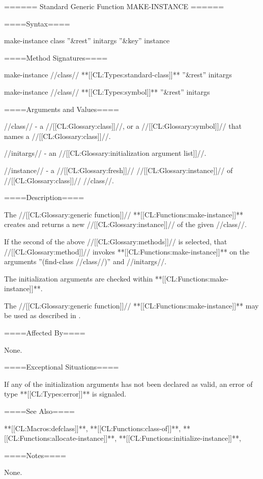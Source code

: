 ====== Standard Generic Function MAKE-INSTANCE ======

====Syntax====


\DefgenWithValues make-instance {class ''&rest'' initargs ''&key'' {\allowotherkeys}} {instance}


====Method Signatures====

\Defmeth make-instance {//class// **[[CL:Types:standard-class]]** ''&rest'' initargs}

\Defmeth make-instance {//class// **[[CL:Types:symbol]]** ''&rest'' initargs}

====Arguments and Values====


//class// - a //[[CL:Glossary:class]]//, or a //[[CL:Glossary:symbol]]// that names a //[[CL:Glossary:class]]//.

//initargs// - an //[[CL:Glossary:initialization argument list]]//.

//instance// - a //[[CL:Glossary:fresh]]// //[[CL:Glossary:instance]]// of //[[CL:Glossary:class]]// //class//.

====Description====

The //[[CL:Glossary:generic function]]// **[[CL:Functions:make-instance]]** creates and returns a new //[[CL:Glossary:instance]]// of the given //class//.

If the second of the above //[[CL:Glossary:methods]]// is selected, that //[[CL:Glossary:method]]// invokes **[[CL:Functions:make-instance]]** on the arguments ''(find-class //class//)'' and //initargs//.

The initialization arguments are checked within **[[CL:Functions:make-instance]]**.

The //[[CL:Glossary:generic function]]// **[[CL:Functions:make-instance]]** may be used as described in \secref\ObjectCreationAndInit.

====Affected By====

None.

====Exceptional Situations====

If any of the initialization arguments has not been declared as valid, an error of type **[[CL:Types:error]]** is signaled.

====See Also====

**[[CL:Macros:defclass]]**, **[[CL:Functions:class-of]]**, **[[CL:Functions:allocate-instance]]**, **[[CL:Functions:initialize-instance]]**, {\secref\ObjectCreationAndInit}


====Notes====

None.




